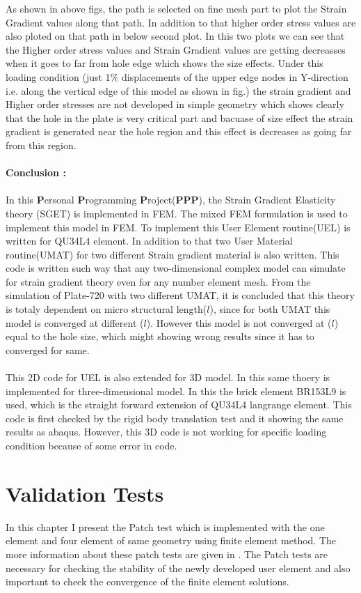 \documentclass[12pt]{article}
\begin{document}
\newpage
As shown in above figs, the path is selected on fine mesh part to plot the Strain Gradient values along that path. In addition to that higher order stress values are also ploted on that path in below second plot. In this two plots we can see that the Higher order stress values and Strain Gradient values are getting decreasses when it goes to far from hole edge which shows the size effects. Under this loading condition (just 1$\%$ displacements of the upper edge nodes in Y-direction i.e. along the vertical edge of this model as shown in fig.) the strain gradient and Higher order stresses are not developed in simple geometry which shows clearly that the hole in the plate is very critical part and bacuase of size effect the strain gradient is generated near the hole region and this effect is decreases as going far from this region.
\\
\\
\textbf{Conclusion :} \\
\\
In this \textbf{P}ersonal \textbf{P}rogramming \textbf{P}roject(\textbf{PPP}), the Strain Gradient Elasticity theory (SGET) is implemented in FEM. The mixed FEM formulation is used to implement this model in FEM. To implement this User Element routine(UEL) is written for QU34L4 element. In addition to that two User Material routine(UMAT) for two different Strain gradient material is also written. This code is written such way that any two-dimensional complex model can simulate for strain gradient theory even for any number element mesh. From the simulation of Plate-720 with two different UMAT, it is concluded that this theory is totaly dependent on micro structural length($ l $), since for both UMAT this model is converged at different ($ l $). However this model is not converged at ($ l $) equal to the hole size, which might showing wrong results since it has to converged for same. \\
\\
This 2D code for UEL is also extended for 3D model. In this same thoery is implemented for three-dimensional model. In this the brick element BR153L9 is used, which is the straight forward extension of QU34L4 langrange element. This code is first checked by the rigid body translation test and it showing the same results as abaqus. However, this 3D code is not working for specific loading condition because of some error in code. 



\newpage
\section{Validation Tests}
In this chapter I present the Patch test which is implemented with the one element and four element of same geometry using finite element method. The more information about these patch tests are given in \cite{Lzybell2007}. The Patch tests are necessary for checking the stability of the newly developed user element and also important to check the convergence of the finite element solutions.  
\end{document}
